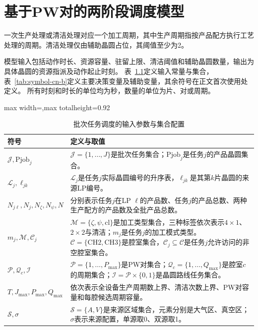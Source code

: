 \chapter{基于PW对的两阶段调度模型}

\setcounter{equation}{0}

一次生产处理或清洁处理对应一个加工周期，其中生产周期指按产品配方执行工艺处理的周期。清洁处理仅由辅助晶圆占位，其阈值至少为2。

模型输入包括动作时长、资源容量、驻留上限、清洁阈值和辅助晶圆数量，输出为具体晶圆的资源指派及动作起止时刻。
表~\ref{tab:symbol-cn-a}定义输入常量与集合，表~\ref{tab:symbol-cn-b}定义主要决策变量及辅助变量，其余符号在正文首次使用处定义。
所有时刻和时长的单位均为秒，数量的单位为片、对或周期。

\begin{table}[!htbp]
\centering\small
\caption{批次任务调度的输入参数与集合配置}
\label{tab:symbol-cn-a}
\renewcommand{\arraystretch}{1.03}
\setlength{\tabcolsep}{4pt}
\begin{adjustbox}{max width=\linewidth,max totalheight=0.92\textheight}
\begin{tabular}{@{}>{\raggedright\arraybackslash}p{}p{}@{}}
\toprule
符号 & 定义与取值\\\midrule
$\mathcal J,\mathrm{Pjob}_j$ & $\mathcal J=\{1,\ldots,J\}$是批次任务集合；$\mathrm{Pjob}_j$是任务$j$的产品晶圆集合。\\
$\mathcal L_j,\ell_{jk}$ & $\mathcal L_j$是任务$j$实际晶圆编号的升序表，$\ell_{jk}$是其第$k$片晶圆的来源LP编号。\\
$N_{j\ell},N_j,N_\zeta,N_\psi,N$ & 分别表示任务$j$在LP $\ell$的产品数、任务$j$的产品总数、两种生产配方的产品数及全批产品总数。\\
$m_j,\mathcal M,\mathcal C_j$ & $\mathcal M=\{\zeta,\psi,\mathrm{cl}\}$是加工类型集合，三种标签依次表示$4\times1$、$2\times2$与清洁；$m_j$是任务$j$的加工模式类型。$\mathcal C=\{\mathrm{CH2},\mathrm{CH3}\}$是腔室集合，$\mathcal C_j\subseteq\mathcal C$是任务$j$允许访问的非空腔室集合。\\
$\mathcal P,\mathcal Q_c,\mathcal I$ & $\mathcal P=\{1,\ldots,P_{\max}\}$是PW对集合；$\mathcal Q_c=\{1,\ldots,Q_{\max}\}$是腔室$c$的周期集合；$\mathcal I=\mathcal P\times\{0,1\}$是晶圆路线任务集合。\\
$T,J_{\max},P_{\max},Q_{\max}$ & 依次表示全设备生产周期数上界、清洁次数上界、PW对容量和每腔候选周期容量。\\
$\mathcal S,\sigma$ & $\mathcal S=\{A,V\}$是来源区域集合，元素分别是大气区、真空区；$\sigma$表示来源配置，单源取0、双源取1。\\

\end{tabular}
\end{adjustbox}
\end{table}
